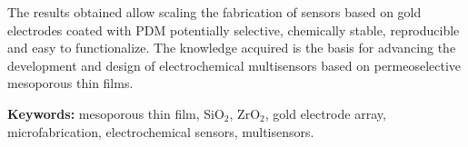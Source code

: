 The results obtained allow scaling the fabrication of sensors based on gold electrodes coated with PDM potentially selective, chemically stable, reproducible and easy to functionalize. The knowledge acquired is the basis for advancing the development and design of electrochemical multisensors based on permeoselective mesoporous thin films.

\vspace*{\fill}

\vfill

\noindent\textbf{Keywords:} mesoporous thin film, SiO$_2$, ZrO$_2$, gold electrode array, microfabrication, electrochemical sensors, multisensors.

\cleardoublepage

